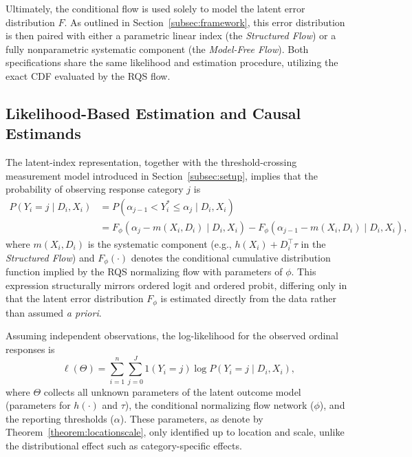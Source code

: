 \documentclass{article}
\begin{document}
Ultimately, the conditional flow is used solely to model the latent error distribution $F$. As outlined in Section~\ref{subsec:framework}, this error distribution is then paired with either a parametric linear index (the \textit{Structured Flow}) or a fully nonparametric systematic component (the \textit{Model-Free Flow}). Both specifications share the same likelihood and estimation procedure, utilizing the exact CDF evaluated by the RQS flow.

\subsection{Likelihood-Based Estimation and Causal Estimands}
\label{subsec:likelihood}

The latent-index representation, together with the threshold-crossing measurement model introduced in Section~\ref{subsec:setup}, implies that the probability of observing response category $j$ is
\begin{align*}
P(Y_i=j\mid D_i,X_i) &= P\left( \alpha_{j-1} < Y_i^\ast \le \alpha_j \mid D_i,X_i \right) \\
&= F_\phi \left( \alpha_j - m(X_i, D_i) \mid D_i,X_i \right)
- F_\phi \left( \alpha_{j-1} - m(X_i, D_i) \mid D_i,X_i \right),
\end{align*}
where $m(X_i, D_i)$ is the systematic component (e.g., $h(X_i) + D_i^\top\tau$ in the \textit{Structured Flow}) and $F_\phi(\cdot)$ denotes the conditional cumulative distribution function implied by the RQS normalizing flow with parameters of $\phi$. This expression structurally mirrors ordered logit and ordered probit, differing only in that the latent error distribution $F_\phi$ is estimated directly from the data rather than assumed \textit{a priori}. 

Assuming independent observations, the log-likelihood for the observed ordinal responses is
\[
\ell(\Theta) = \sum_{i=1}^{n} \sum_{j=0}^{J} 1(Y_i=j) \log P(Y_i=j\mid D_i,X_i),
\]
where $\Theta$ collects all unknown parameters of the latent outcome model (parameters for $h(\cdot)$ and $\tau$), the conditional normalizing flow network ($\phi$), and the reporting thresholds ($\alpha$). These parameters, as denote by Theorem~\ref{theorem:locationscale}, only identified up to location and scale, unlike the distributional effect such as category-specific effects. 
\end{document}
